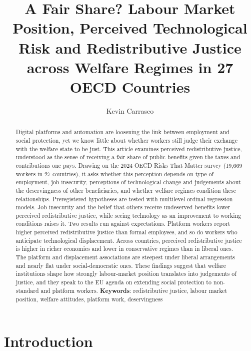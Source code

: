 \documentclass[
  12pt,
]{article}
\title{A Fair Share? Labour Market Position, Perceived Technological
Risk and Redistributive Justice across Welfare Regimes in 27 OECD
Countries}
\author{Kevin Carrasco}
\affil{%
                  Nucleo Milenio sobre Evolución del Trabajo (M-new)
              }
\date{}
\begin{document}
\maketitle
\begin{abstract}
Digital platforms and automation are loosening the link between
employment and social protection, yet we know little about whether
workers still judge their exchange with the welfare state to be just.
This article examines perceived redistributive justice, understood as
the sense of receiving a fair share of public benefits given the taxes
and contributions one pays. Drawing on the 2024 OECD Risks That Matter
survey (19,669 workers in 27 countries), it asks whether this perception
depends on type of employment, job insecurity, perceptions of
technological change and judgements about the deservingness of other
beneficiaries, and whether welfare regimes condition these
relationships. Preregistered hypotheses are tested with multilevel
ordinal regression models. Job insecurity and the belief that others
receive undeserved benefits lower perceived redistributive justice,
while seeing technology as an improvement to working conditions raises
it. Two results run against expectations. Platform workers report higher
perceived redistributive justice than formal employees, and so do
workers who anticipate technological displacement. Across countries,
perceived redistributive justice is higher in richer economies and lower
in conservative regimes than in liberal ones. The platform and
displacement associations are steepest under liberal arrangements and
nearly flat under social-democratic ones. These findings suggest that
welfare institutions shape how strongly labour-market position
translates into judgements of justice, and they speak to the EU agenda
on extending social protection to non-standard and platform workers.
\newline \newline \textbf{Keywords}: redistributive justice, labour
market position, welfare attitudes, platform work, deservingness
\end{abstract}


\section{Introduction}\label{introduction}
\end{document}
